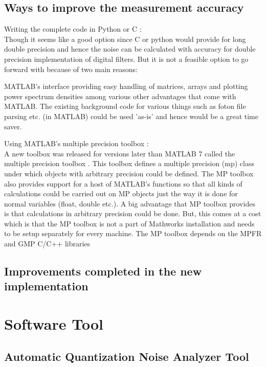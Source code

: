 \documentclass[colorlinks=true,pdfstartview=FitV,linkcolor=blue,
            citecolor=red,urlcolor=magenta]{ligodoc}
\begin{document}
	
	\subsection{Ways to improve the measurement accuracy}
		\begin{enumerate}
			\list Writing the complete code in Python or C  : \\ Though it seems like a good option since C or python would provide for long double precision \cite{long_double} and hence the noise can be calculated with accuracy for double precision implementation of digital filters. But it is not a feasible option to go forward with because of two main reasons:
				\begin{enumerate}
					\list MATLAB's interface providing easy handling of matrices, arrays and plotting power spectrum densities among various other advantages that come with MATLAB.
					\list The existing background code for various things such as foton file parsing etc. (in MATLAB) could be used 'as-is' and hence would be a great time saver. 
				\end{enumerate}
			\list Using MATLAB's multiple precision toolbox : \\ A new toolbox was released for versions later than MATLAB 7 called the multiple precision toolbox \cite{MP}. This toolbox defines a multiple precision (mp) class under which objects with arbitrary precision could be defined. The MP toolbox also provides support for a host of MATLAB's functions so that all kinds of calculations could be carried out on MP objects just the way it is done for normal variables (float, double etc.). A big advantage that MP toolbox provides is that calculations in arbitrary precision could be done. But, this comes at a cost which is that the MP toolbox is not a part of Mathworks installation and needs to be setup separately for every machine. The MP toolbox depends on the MPFR and GMP C/C++ libraries
		\end{enumerate}
	\subsection{Improvements completed in the new implementation}
\section{Software Tool}
	\subsection{Automatic Quantization Noise Analyzer Tool}
\end{document}
